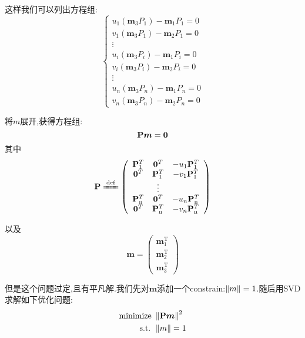 这样我们可以列出方程组:
\begin{equation}
	\left\{\begin{array}{c}
		u_{1}\left(\mathbf{m}_{3} P_{1}\right)-\mathbf{m}_{1} P_{1}=0 \\
		v_{1}\left(\mathbf{m}_{3} P_{1}\right)-\mathbf{m}_{2} P_{1}=0 \\
		\vdots \\
		u_{i}\left(\mathbf{m}_{3} P_{i}\right)-\mathbf{m}_{1} P_{i}=0 \\
		v_{i}\left(\mathbf{m}_{3} P_{i}\right)-\mathbf{m}_{2} P_{i}=0 \\
		\vdots \\
		u_{n}\left(\mathbf{m}_{3} P_{n}\right)-\mathbf{m}_{1} P_{n}=0 \\
		v_{n}\left(\mathbf{m}_{3} P_{n}\right)-\mathbf{m}_{2} P_{n}=0
	\end{array}\right.
\end{equation}

将$m$展开,获得方程组:
\begin{equation}
	\bold{P} \bm m = \bm 0
\end{equation}
其中
\begin{equation}
	\mathbf{P}\xlongequal{\operatorname{def}}\left(\begin{array}{ccc}
		\mathbf{P}_{1}^{T} & \mathbf{0}^{T} & -u_{1} \mathbf{P}_{1}^{T} \\
		\mathbf{0}^{T} & \mathbf{P}_{1}^{T} & -v_{1} \mathbf{P}_{1}^{T} \\
		& \vdots & \\
		\mathbf{P}_{\mathrm{n}}^{T} & \mathbf{0}^{T} & -u_{n} \mathbf{P}_{\mathrm{n}}^{T} \\
		\mathbf{0}^{T} & \mathbf{P}_{\mathrm{n}}^{T} & -v_{n} \mathbf{P}_{\mathrm{n}}^{T}
	\end{array}\right)
\end{equation}

以及
\begin{equation}
	\boldsymbol{m}=\left(\begin{array}{c}
		\mathbf{m}_{1}^{\mathrm{T}} \\
		\mathbf{m}_{2}^{\mathrm{T}} \\
		\mathbf{m}_{3}^{\mathrm{T}}
	\end{array}\right)
\end{equation}

但是这个问题过定,且有平凡解.我们先对$\bm m$添加一个constrain:$\left \Vert m \right \Vert = 1$.随后用SVD求解如下优化问题:
\begin{equation}
	\begin{split}
		\text{minimize } & \left \Vert \bold{P} \bm m \right \Vert^2
		\\
		\textup{ s.t. } & \left \Vert m \right \Vert = 1
	\end{split}
\end{equation}

